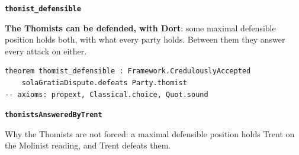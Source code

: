 \documentclass[11pt]{article}
\begin{document}
\par\medskip\noindent\textbf{\texttt{thomist\_\allowbreak{}defensible}}\par\nobreak\noindent
\textbf{The Thomists can be defended, with Dort}: some maximal defensible position holds both, with what every party holds. Between them they answer every attack on either.

{\small\begin{verbatim}
theorem thomist_defensible : Framework.CredulouslyAccepted
    solaGratiaDispute.defeats Party.thomist
-- axioms: propext, Classical.choice, Quot.sound
\end{verbatim}}
\par\medskip\noindent\textbf{\texttt{thomists\allowbreak{}Answered\allowbreak{}By\allowbreak{}Trent}}\par\nobreak\noindent
Why the Thomists are not forced: a maximal defensible position holds Trent on the Molinist reading, and Trent defeats them.
\end{document}
